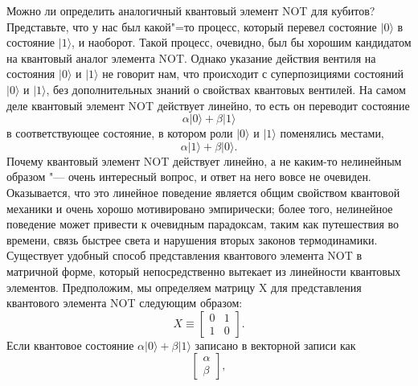 \begin{multicols}{2}
{        Можно ли определить аналогичный квантовый элемент NOT для кубитов? Представьте, что у нас был
        какой"=то процесс, который перевел состояние $\vert0\rangle$ в состояние $\vert1\rangle$, и наоборот.
        Такой процесс, очевидно, был бы хорошим кандидатом на квантовый аналог элемента NOT. Однако
        указание действия вентиля на состояния $\vert0\rangle$ и $\vert1\rangle$ не говорит нам, что происходит с
        суперпозициями состояний $\vert0\rangle$ и $\vert1\rangle$, без дополнительных знаний о свойствах
        квантовых вентилей. На самом деле квантовый элемент NOT действует линейно, то есть он переводит состояние
        \begin{equation}
            \alpha\vert0\rangle + \beta\vert1\rangle
        \end{equation}
        в соответствующее состояние, в котором роли $\vert0\rangle$ и $\vert1\rangle$ поменялись местами,
        \begin{equation}
            \alpha\vert1\rangle + \beta\vert0\rangle.
        \end{equation}
        Почему квантовый элемент NOT действует линейно, а не каким-то нелинейным образом "--- очень
        интересный вопрос, и ответ на него вовсе не очевиден. Оказывается, что это линейное
        поведение является общим свойством квантовой механики и очень хорошо мотивировано эмпирически;
        более того, нелинейное поведение может привести к очевидным парадоксам, таким как путешествия во времени, связь быстрее света и нарушения вторых законов термодинамики.
        Существует удобный способ представления квантового элемента NOT в матричной форме,
        который непосредственно вытекает из линейности квантовых элементов. Предположим, мы определяем матрицу
        X для представления квантового элемента NOT следующим образом:
        \begin{equation}
            X \equiv \begin{bmatrix}
            0& 1\\
            1& 0
            \end{bmatrix}.
        \end{equation}
        Если квантовое состояние $\alpha\vert0\rangle + \beta\vert1\rangle$ записано в векторной записи как
        \begin{equation}
            \begin{bmatrix}
                \alpha\\
                \beta
            \end{bmatrix},

\end{equation}}
\end{multicols}
